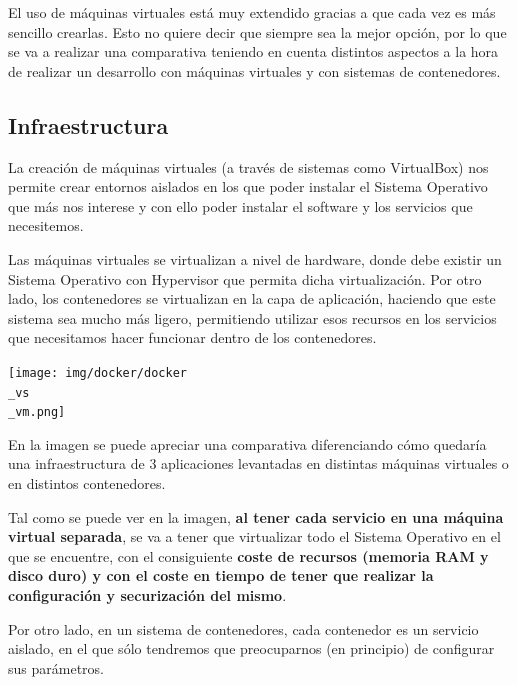 El uso de máquinas virtuales está muy extendido gracias a que cada vez es más sencillo crearlas. Esto no quiere decir que siempre sea la mejor opción, por lo que  se va a realizar una comparativa teniendo en cuenta distintos aspectos a la hora de realizar un desarrollo con máquinas virtuales y con sistemas de contenedores.


\subsection{Infraestructura}

La creación de máquinas virtuales (a través de sistemas como VirtualBox) nos permite crear entornos aislados en los que poder instalar el Sistema Operativo que más nos interese y con ello poder instalar el software y los servicios que necesitemos.

Las máquinas virtuales se virtualizan a nivel de hardware, donde debe existir un Sistema Operativo con Hypervisor que permita dicha virtualización. Por otro lado, los contenedores se virtualizan en la capa de aplicación, haciendo que este sistema sea mucho más ligero, permitiendo utilizar esos recursos en los servicios que necesitamos hacer funcionar dentro de los contenedores.

\vspace{-15pt}
\begin{center}
    \texttt{[image: img/docker/docker\\\_vs\\\_vm.png]}
\end{center}
\vspace{-15pt}


En la imagen se puede apreciar una comparativa diferenciando cómo quedaría una infraestructura de 3 aplicaciones levantadas en distintas máquinas virtuales o en distintos contenedores.

Tal como se puede ver en la imagen, \textbf{al tener cada servicio en una máquina virtual separada}, se va a tener que virtualizar todo el Sistema Operativo en el que se encuentre, con el consiguiente \textbf{coste de recursos (memoria RAM y disco duro) y con el coste en tiempo de tener que realizar la configuración y securización del mismo}.


Por otro lado, en un sistema de contenedores, cada contenedor es un servicio aislado, en el que sólo tendremos que preocuparnos (en principio) de configurar sus parámetros.


